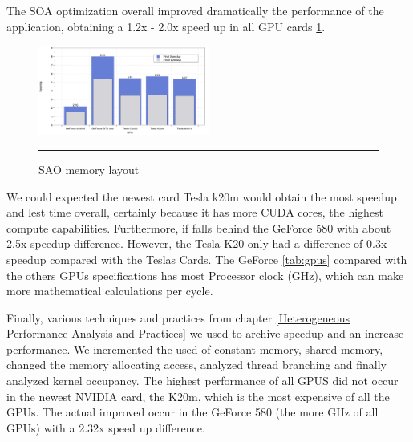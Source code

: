 The SOA optimization overall improved dramatically the performance of the application, obtaining a 1.2x - 2.0x speed up in all GPU cards \ref{fig:speedup}.


\begin{figure}[htbp]
	\centering
		\includegraphics[width=0.5\textwidth]{Figures/speed.png}
		\rule{35em}{0.2pt}
	\caption[Structure of Arrays (SAO)]{SAO memory layout}
	\label{fig:speedup}
\end{figure}


We could expected the newest card Tesla k20m would obtain the most speedup and lest time overall,  certainly because it has more CUDA cores, the highest compute capabilities. Furthermore, if falls behind the GeForce 580 with about 2.5x speedup difference. However, the Tesla K20 only had a difference of 0.3x speedup compared with the Teslas Cards. The GeForce \ref{tab:gpus} compared with the others GPUs specifications has most Processor clock (GHz), which can make more mathematical calculations per cycle.


  \vspace{3.5em}

Finally, various techniques and practices from chapter \ref{Heterogeneous Performance Analysis and Practices} we used to archive speedup and an increase performance. We incremented the used of constant memory, shared memory, changed the memory allocating access, analyzed thread branching and finally analyzed kernel occupancy. The highest performance of all GPUS did not occur in the newest NVIDIA card, the K20m, which is the most expensive of all the GPUs. The actual improved occur in the GeForce 580 (the more GHz of all GPUs) with a 2.32x speed up difference.
  
